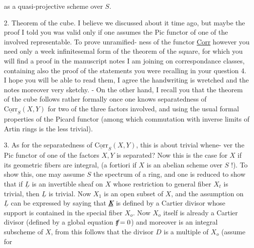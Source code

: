 as a quasi-projective scheme over $S$.

2. Theorem of the cube. I believe we discussed about it time ago, but maybe the proof I told you was valid only if one assumes the Pic functor of one of the  involved representable. To prove unramified-
ness of the functor \uline{Corr} however you need only a week infinitesemal form of the theorem of the square, for which you will find a proof in the manuscript notes I am joining on correspondance classes, containing also the proof of the statements you were recalling in your question 4. I hope you will be able to read them, I agree the handwriting is wretched and the notes moreover very sketchy. - On the other hand, I recall you that the theorem of the cube follows rather formally once one knows separatedness of $\underline{\mathrm{Corr}}_{S}(X,Y)$ for two of the three factors involved, and using the usual formal properties of the Picard functor (among which commutation with inverse limits of Artin rings is the less trivial).

3. As for the separatedness of $\underline{\mathrm{Corr}}_{S}(X,Y)$, this is about trivial whene-
ver the Pic functor of one of the factors $X,Y$ is separated? Now this is  the case  for $X$ if its geometric fibers are integral, (a fortiori if $X$ is an abelian scheme over $S$ !). To show this, one may assume $S$ the spectrum of a  ring, and one is reduced to show that if $\underline{L}$ is an invertible sheaf on $X$ whose restriction to  general fiber $X_{t}$ is trivial, then $\underline{L}$ is trivial. Now $X_{1}$ is an open subset of $X$, and the assumption on $\underline{L}$ can be expressed by saying that $\underline{\mathord{\rlap{$X$}L}}$ is defined by a Cartier divisor whose support is contained in the special fiber $X_{o}$. Now $X_{o}$ itself is already a Cartier divisor (defined by a global equation $\mathord{\rlap{$f$}t}=0$) and moreover is an integral subscheme of $X$, from this follows that the divisor $D$ is a multiple of $X_{o}$ (assume for
